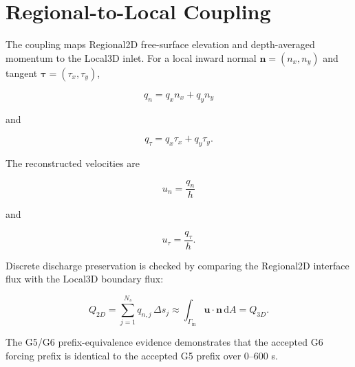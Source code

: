 \section{Regional-to-Local Coupling}

The coupling maps Regional2D free-surface elevation and depth-averaged momentum to the Local3D inlet. For a local inward normal \(\mathbf n=(n_x,n_y)\) and tangent \(\boldsymbol\tau=(\tau_x,\tau_y)\),

\begin{equation}
\label{eq:normal-momentum}
q_n=q_xn_x+q_yn_y
\end{equation}

and

\begin{equation}
\label{eq:tangential-momentum}
q_\tau=q_x\tau_x+q_y\tau_y .
\end{equation}

The reconstructed velocities are

\begin{equation}
\label{eq:normal-velocity}
u_n=\frac{q_n}{h}
\end{equation}

and

\begin{equation}
\label{eq:tangential-velocity}
u_\tau=\frac{q_\tau}{h}.
\end{equation}

Discrete discharge preservation is checked by comparing the Regional2D interface flux with the Local3D boundary flux:

\begin{equation}
\label{eq:discharge-preservation}
Q_{2D}
=
\sum_{j=1}^{N_s} q_{n,j}\,\Delta s_j
\approx
\int_{\Gamma_{\mathrm{in}}}\mathbf u\cdot\mathbf n\,\mathrm dA
=
Q_{3D}.
\end{equation}

The G5/G6 prefix-equivalence evidence demonstrates that the accepted G6 forcing prefix is identical to the accepted G5 prefix over 0--600 s.
